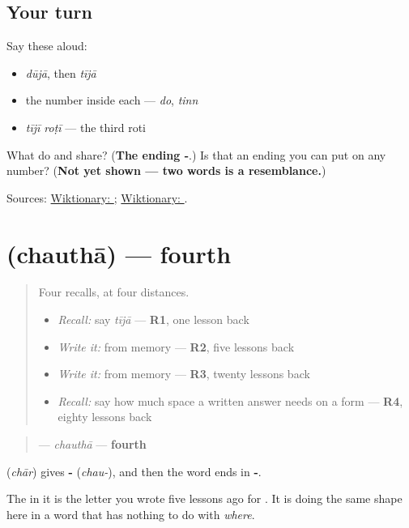 \subsection*{Your turn}
Say these aloud:

\begin{itemize}
\raggedright
  \item \emph{dūjā}, then \emph{tījā}
  \item the number inside each — \emph{do}, \emph{tinn}
  \item \emph{tījī roṭī} — the third roti
\end{itemize}

\begin{tcolorbox}[breakable,colback=teal!4,colframe=teal!35!black,title={Before you move on}]
What do \textbf{} and \textbf{} share? (\textbf{The ending -}.) Is that an ending you can put on any number? (\textbf{Not yet shown — two words is a resemblance.})

Sources: \href{https://en.wiktionary.org/wiki/\%E0\%A8\%A4\%E0\%A9\%80\%E0\%A8\%9C\%E0\%A8\%BE}{Wiktionary: }; \href{https://en.wiktionary.org/wiki/\%E0\%A8\%A6\%E0\%A9\%82\%E0\%A8\%9C\%E0\%A8\%BE}{Wiktionary: }.
\end{tcolorbox}
\section[\texorpdfstring{\pa{ਚੌਥਾ} (chauthā)}{ਚੌਥਾ (chauthā)}]{ (chauthā) — fourth}

\label{lesson:PA-C44-chautha}



\begin{quote}
Four recalls, at four distances.

\begin{itemize}
\raggedright
  \item \emph{Recall:} say \emph{tījā} — \textbf{R1}, one lesson back
  \item \emph{Write it:} \textbf{} from memory — \textbf{R2}, five lessons back
  \item \emph{Write it:} \textbf{} from memory — \textbf{R3}, twenty lessons back
  \item \emph{Recall:} say how much space a written answer needs on a form — \textbf{R4}, eighty lessons back
\end{itemize}
\end{quote}

\begin{cousinweb}
\begin{quote}
\textbf{} — \emph{chauthā} — \textbf{fourth}
\end{quote}

\textbf{} (\emph{chār}) gives \textbf{-} (\emph{chau-}), and then the word ends in \textbf{-}.

The \textbf{} in it is the letter you wrote five lessons ago for \textbf{}. It is doing the same shape here in a word that has nothing to do with \emph{where}.
\end{cousinweb}

